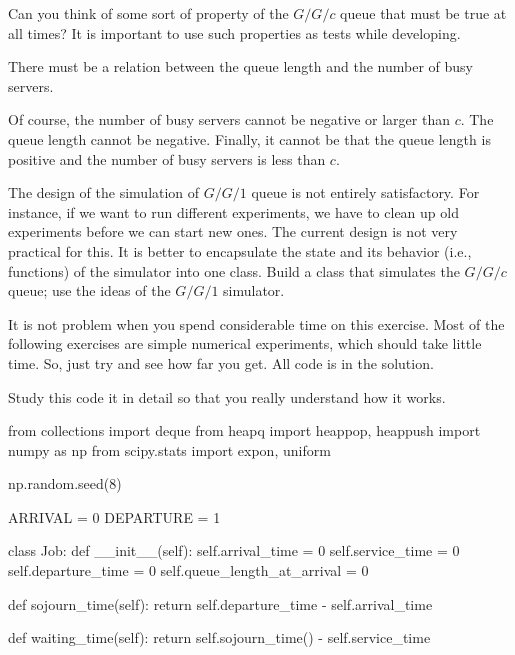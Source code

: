 \begin{exercise}
  Can you think of some sort of property of the $G/G/c$ queue that must be true at all times? It is important to use such properties  as tests while developing.
\begin{hint}
    There must be a relation between the queue length and the number of busy servers.
\end{hint}
\begin{solution}
    Of course, the number of busy servers cannot be negative or larger than $c$. The queue length cannot be negative. Finally, it cannot be that  the queue length is positive and the number of busy servers is less than $c$.
  \end{solution}
\end{exercise}

\begin{exercise}
  The design of the simulation of $G/G/1$ queue is not entirely satisfactory. For instance, if we want to run different experiments, we have to clean up old experiments before we can start new ones. The current design is not very practical for this. It is better to encapsulate the state and its behavior (i.e., functions) of the simulator into one class. Build a class that simulates the $G/G/c$ queue; use the ideas of the $G/G/1$ simulator.

It is not  problem when you spend considerable time on this exercise. Most of the following exercises are simple numerical experiments, which should take little time. So, just try and see how far you get. All code is in the solution.

\begin{solution}
  Study this code it in detail so that you really understand how it works.

\begin{pyverbatim}
from collections import deque
from heapq import heappop, heappush
import numpy as np
from scipy.stats import expon, uniform

np.random.seed(8)

ARRIVAL = 0
DEPARTURE = 1


class Job:
    def __init__(self):
        self.arrival_time = 0
        self.service_time = 0
        self.departure_time = 0
        self.queue_length_at_arrival = 0

    def sojourn_time(self):
        return self.departure_time - self.arrival_time

    def waiting_time(self):
        return self.sojourn_time() - self.service_time


\end{pyverbatim}
\end{solution}
\end{exercise}

